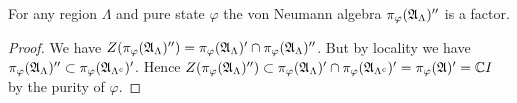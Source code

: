 \documentclass[11pt]{amsart}
\begin{document}

\begin{lem}\label{lem: restrictions of pure state GNS reps are factors}
    For any region $\Lambda$ and pure state $\varphi$ the von Neumann algebra $\pi_\varphi(\mathfrak{A}_\Lambda)''$ is a factor.
    \begin{proof}
        We have $ Z(\pi_\varphi(\mathfrak{A}_\Lambda)'')=\pi_\varphi(\mathfrak{A}_\Lambda)'\cap\pi_\varphi(\mathfrak{A}_\Lambda)''$. But by locality we have $\pi_\varphi(\mathfrak{A}_\Lambda)''\subset \pi_\varphi(\mathfrak{A}_{\Lambda^c})'$. Hence $Z(\pi_\varphi(\mathfrak{A}_\Lambda)'')\subset\pi_\varphi(\mathfrak{A}_\Lambda)'\cap\pi_\varphi(\mathfrak{A}_{\Lambda^c})'=\pi_\varphi(\mathfrak{A})'=\Bbb CI$ by the purity of $\varphi$.  
    \end{proof}
\end{lem}
\end{document}
